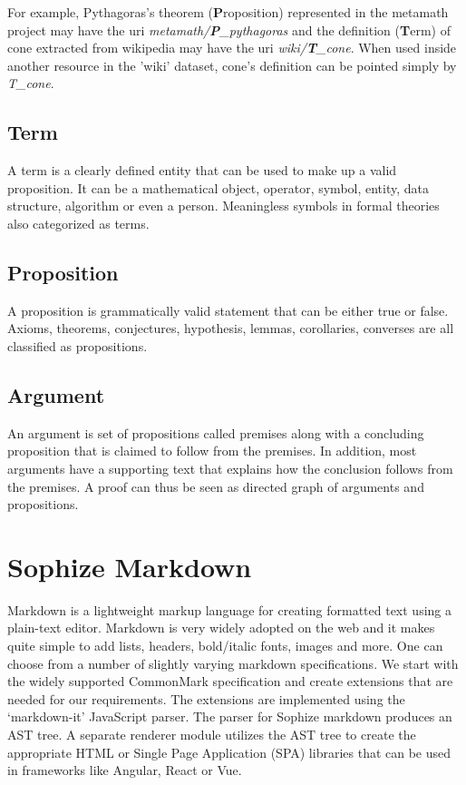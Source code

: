 \documentclass[a4paper]{article}
\begin{document}
For example, Pythagoras's theorem (\textbf{P}roposition) represented in the metamath project may have the uri \emph{metamath/\textbf{P}\_pythagoras} and the definition (\textbf{T}erm) of cone extracted from wikipedia may have the uri \emph{wiki/\textbf{T}\_cone}. When used inside another resource in the 'wiki' dataset, cone's definition can be pointed simply by \emph{T\_cone}.


\subsection*{Term}
A term is a clearly defined entity that can be used to make up a valid proposition. It can be a mathematical object, operator, symbol, entity, data structure, algorithm or even a person. Meaningless symbols in formal theories also categorized as terms.

\subsection*{Proposition}
A proposition is grammatically valid statement that can be either true or false. Axioms, theorems, conjectures, hypothesis, lemmas, corollaries, converses are all classified as propositions.

\subsection*{Argument}
An argument is set of propositions called premises along with a concluding proposition that is claimed to follow from the premises. In addition, most arguments have a supporting text that explains how the conclusion follows from the premises. A proof can thus be seen as directed graph of arguments and propositions.


\section{Sophize Markdown}
Markdown is a lightweight markup language for creating formatted text using a plain-text editor. Markdown is very widely adopted on the web and it makes quite simple to add lists, headers, bold/italic fonts, images and more. One can choose from a number of slightly varying markdown specifications. We start with the widely supported CommonMark specification and create extensions that are needed for our requirements. The extensions are implemented using the `markdown-it' JavaScript parser. The parser for Sophize markdown produces an AST tree. A separate renderer module utilizes the AST tree to create the appropriate HTML or Single Page Application (SPA) libraries that can be used in frameworks like Angular, React or Vue.
\end{document}

